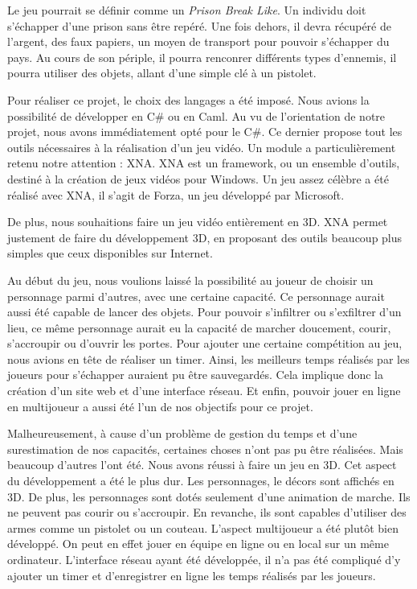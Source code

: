 \documentclass[12pt]{article}
\begin{document}
Le jeu pourrait se définir comme un \textit{Prison Break Like}. Un individu doit s'échapper d'une prison sans être repéré. Une fois dehors, il devra récupéré de l'argent, des faux papiers, un moyen de transport pour pouvoir s'échapper du pays. Au cours de son périple, il pourra renconrer différents types d'ennemis, il pourra utiliser des objets, allant d'une simple clé à un pistolet.

Pour réaliser ce projet, le choix des langages a été imposé. Nous avions la possibilité de développer en C\# ou en Caml. Au vu de l'orientation de notre projet, nous avons immédiatement opté pour le C\#. Ce dernier propose tout les outils nécessaires à la réalisation d'un jeu vidéo. Un module a particulièrement retenu notre attention : XNA. XNA est un framework, ou un ensemble d'outils, destiné à la création de jeux vidéos pour Windows. Un jeu assez célèbre a été réalisé avec XNA, il s'agit de Forza, un jeu développé par Microsoft. 

De plus, nous souhaitions faire un jeu vidéo entièrement en 3D. XNA permet justement de faire du développement 3D, en proposant des outils beaucoup plus simples que ceux disponibles sur Internet.

Au début du jeu, nous voulions laissé la possibilité au joueur de choisir un personnage parmi d'autres, avec une certaine capacité. Ce personnage aurait aussi été capable de lancer des objets. Pour pouvoir s'infiltrer ou s'exfiltrer d'un lieu, ce même personnage aurait eu la capacité de marcher doucement, courir, s'accroupir ou d'ouvrir les portes. Pour ajouter une certaine compétition au jeu, nous avions en tête de réaliser un timer. Ainsi, les meilleurs temps réalisés par les joueurs pour s'échapper auraient pu être sauvegardés. Cela implique donc la création d'un site web et d'une interface réseau. Et enfin, pouvoir jouer en ligne en multijoueur a aussi été l'un de nos objectifs pour ce projet.

Malheureusement, à cause d'un problème de gestion du temps et d'une surestimation de nos capacités, certaines choses n'ont pas pu être réalisées. Mais beaucoup d'autres l'ont été. Nous avons réussi à faire un jeu en 3D. Cet aspect du développement a été le plus dur. Les personnages, le décors sont affichés en 3D. De plus, les personnages sont dotés seulement d'une animation de marche. Ils ne peuvent pas courir ou s'accroupir. En revanche, ils sont capables d'utiliser des armes comme un pistolet ou un couteau. L'aspect multijoueur a été plutôt bien développé. On peut en effet jouer en équipe en ligne ou en local sur un même ordinateur. L'interface réseau ayant été développée, il n'a pas été compliqué d'y ajouter un timer et d'enregistrer en ligne les temps réalisés par les joueurs.
\end{document}
